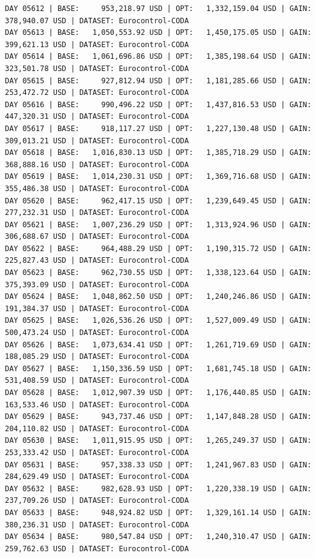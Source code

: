 \documentclass[11pt,a4paper]{article}
\begin{document}
\begin{verbatim}
DAY 05612 | BASE:     953,218.97 USD | OPT:   1,332,159.04 USD | GAIN: 378,940.07 USD | DATASET: Eurocontrol-CODA
DAY 05613 | BASE:   1,050,553.92 USD | OPT:   1,450,175.05 USD | GAIN: 399,621.13 USD | DATASET: Eurocontrol-CODA
DAY 05614 | BASE:   1,061,696.86 USD | OPT:   1,385,198.64 USD | GAIN: 323,501.78 USD | DATASET: Eurocontrol-CODA
DAY 05615 | BASE:     927,812.94 USD | OPT:   1,181,285.66 USD | GAIN: 253,472.72 USD | DATASET: Eurocontrol-CODA
DAY 05616 | BASE:     990,496.22 USD | OPT:   1,437,816.53 USD | GAIN: 447,320.31 USD | DATASET: Eurocontrol-CODA
DAY 05617 | BASE:     918,117.27 USD | OPT:   1,227,130.48 USD | GAIN: 309,013.21 USD | DATASET: Eurocontrol-CODA
DAY 05618 | BASE:   1,016,830.13 USD | OPT:   1,385,718.29 USD | GAIN: 368,888.16 USD | DATASET: Eurocontrol-CODA
DAY 05619 | BASE:   1,014,230.31 USD | OPT:   1,369,716.68 USD | GAIN: 355,486.38 USD | DATASET: Eurocontrol-CODA
DAY 05620 | BASE:     962,417.15 USD | OPT:   1,239,649.45 USD | GAIN: 277,232.31 USD | DATASET: Eurocontrol-CODA
DAY 05621 | BASE:   1,007,236.29 USD | OPT:   1,313,924.96 USD | GAIN: 306,688.67 USD | DATASET: Eurocontrol-CODA
DAY 05622 | BASE:     964,488.29 USD | OPT:   1,190,315.72 USD | GAIN: 225,827.43 USD | DATASET: Eurocontrol-CODA
DAY 05623 | BASE:     962,730.55 USD | OPT:   1,338,123.64 USD | GAIN: 375,393.09 USD | DATASET: Eurocontrol-CODA
DAY 05624 | BASE:   1,048,862.50 USD | OPT:   1,240,246.86 USD | GAIN: 191,384.37 USD | DATASET: Eurocontrol-CODA
DAY 05625 | BASE:   1,026,536.26 USD | OPT:   1,527,009.49 USD | GAIN: 500,473.24 USD | DATASET: Eurocontrol-CODA
DAY 05626 | BASE:   1,073,634.41 USD | OPT:   1,261,719.69 USD | GAIN: 188,085.29 USD | DATASET: Eurocontrol-CODA
DAY 05627 | BASE:   1,150,336.59 USD | OPT:   1,681,745.18 USD | GAIN: 531,408.59 USD | DATASET: Eurocontrol-CODA
DAY 05628 | BASE:   1,012,907.39 USD | OPT:   1,176,440.85 USD | GAIN: 163,533.46 USD | DATASET: Eurocontrol-CODA
DAY 05629 | BASE:     943,737.46 USD | OPT:   1,147,848.28 USD | GAIN: 204,110.82 USD | DATASET: Eurocontrol-CODA
DAY 05630 | BASE:   1,011,915.95 USD | OPT:   1,265,249.37 USD | GAIN: 253,333.42 USD | DATASET: Eurocontrol-CODA
DAY 05631 | BASE:     957,338.33 USD | OPT:   1,241,967.83 USD | GAIN: 284,629.49 USD | DATASET: Eurocontrol-CODA
DAY 05632 | BASE:     982,628.93 USD | OPT:   1,220,338.19 USD | GAIN: 237,709.26 USD | DATASET: Eurocontrol-CODA
DAY 05633 | BASE:     948,924.82 USD | OPT:   1,329,161.14 USD | GAIN: 380,236.31 USD | DATASET: Eurocontrol-CODA
DAY 05634 | BASE:     980,547.84 USD | OPT:   1,240,310.47 USD | GAIN: 259,762.63 USD | DATASET: Eurocontrol-CODA

\end{verbatim}
\end{document}
